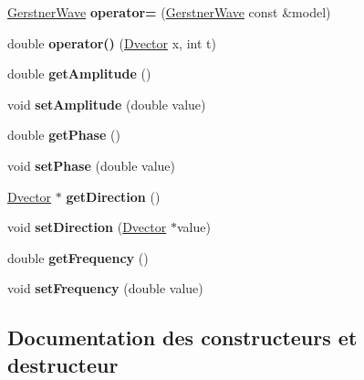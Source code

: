 \begin{DoxyCompactItemize}
\item 
\mbox{\label{class_gerstner_wave_ae776ca443eb1bf78bcb296686ccf27ae}} 
\hyperlink{class_gerstner_wave}{Gerstner\+Wave} {\bfseries operator=} (\hyperlink{class_gerstner_wave}{Gerstner\+Wave} const \&model)
\item 
\mbox{\label{class_gerstner_wave_a36defd5580e9d7aace8c8ba36ec19bcd}} 
double {\bfseries operator()} (\hyperlink{class_dvector}{Dvector} x, int t)
\item 
\mbox{\label{class_gerstner_wave_a4b3989096ad666a3daf18c9e61a33818}} 
double {\bfseries get\+Amplitude} ()
\item 
\mbox{\label{class_gerstner_wave_a3b499d792884b962fadfd58b3003c2c2}} 
void {\bfseries set\+Amplitude} (double value)
\item 
\mbox{\label{class_gerstner_wave_aec45e17327906cf1aa7e746a5cd92596}} 
double {\bfseries get\+Phase} ()
\item 
\mbox{\label{class_gerstner_wave_a4e5a1f7f408d79bb2eab24cdfa5cdf08}} 
void {\bfseries set\+Phase} (double value)
\item 
\mbox{\label{class_gerstner_wave_ade0e4f9a29e27253a7096cf37dcd52d6}} 
\hyperlink{class_dvector}{Dvector} $\ast$ {\bfseries get\+Direction} ()
\item 
\mbox{\label{class_gerstner_wave_a722535521e43ba6f6c5e28a578ee824b}} 
void {\bfseries set\+Direction} (\hyperlink{class_dvector}{Dvector} $\ast$value)
\item 
\mbox{\label{class_gerstner_wave_a254b842667e2a2c6ce10f0f7b965c458}} 
double {\bfseries get\+Frequency} ()
\item 
\mbox{\label{class_gerstner_wave_a7ea4b613d091da359115183c43ddeb2a}} 
void {\bfseries set\+Frequency} (double value)
\end{DoxyCompactItemize}


\subsection{Documentation des constructeurs et destructeur}
\mbox{\label{class_gerstner_wave_aca3a91ab8ae49e3814bfd5b6e4607f31}} 
